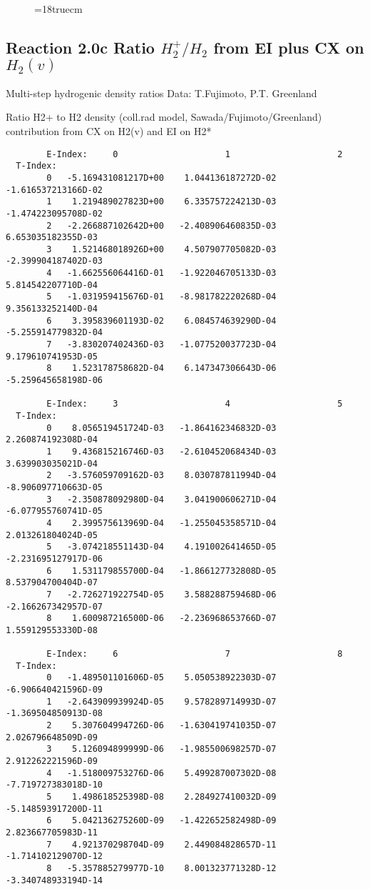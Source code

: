 \begin{figure} \label{2.0b}
\epsfxsize=18truecm
\end{figure}

\newpage

\subsection{
Reaction 2.0c   Ratio $H_2^+/H_2$ from EI plus CX on $H_2(v)$}

 Multi-step hydrogenic density ratios
 Data: T.Fujimoto, P.T. Greenland


  Ratio H2+ to H2 density
  (coll.rad model, Sawada/Fujimoto/Greenland)
  contribution from CX on H2(v) and EI on H2*

\begin{verbatim}
        E-Index:     0                     1                     2
  T-Index:
        0   -5.169431081217D+00    1.044136187272D-02   -1.616537213166D-02
        1    1.219489027823D+00    6.335757224213D-03   -1.474223095708D-02
        2   -2.266887102642D+00   -2.408906460835D-03    6.653035182355D-03
        3    1.521468018926D+00    4.507907705082D-03   -2.399904187402D-03
        4   -1.662556064416D-01   -1.922046705133D-03    5.814542207710D-04
        5   -1.031959415676D-01   -8.981782220268D-04    9.356133252140D-04
        6    3.395839601193D-02    6.084574639290D-04   -5.255914779832D-04
        7   -3.830207402436D-03   -1.077520037723D-04    9.179610741953D-05
        8    1.523178758682D-04    6.147347306643D-06   -5.259645658198D-06

        E-Index:     3                     4                     5
  T-Index:
        0    8.056519451724D-03   -1.864162346832D-03    2.260874192308D-04
        1    9.436815216746D-03   -2.610452068434D-03    3.639903035021D-04
        2   -3.576059709162D-03    8.030787811994D-04   -8.906097710663D-05
        3   -2.350878092980D-04    3.041900606271D-04   -6.077955760741D-05
        4    2.399575613969D-04   -1.255045358571D-04    2.013261804024D-05
        5   -3.074218551143D-04    4.191002641465D-05   -2.231695127917D-06
        6    1.531179855700D-04   -1.866127732808D-05    8.537904700404D-07
        7   -2.726271922754D-05    3.588288759468D-06   -2.166267342957D-07
        8    1.600987216500D-06   -2.236968653766D-07    1.559129553330D-08

        E-Index:     6                     7                     8
  T-Index:
        0   -1.489501101606D-05    5.050538922303D-07   -6.906640421596D-09
        1   -2.643909939924D-05    9.578289714993D-07   -1.369504850913D-08
        2    5.307604994726D-06   -1.630419741035D-07    2.026796648509D-09
        3    5.126094899999D-06   -1.985500698257D-07    2.912262221596D-09
        4   -1.518009753276D-06    5.499287007302D-08   -7.719727383018D-10
        5    1.498618525398D-08    2.284927410032D-09   -5.148593917200D-11
        6    5.042136275260D-09   -1.422652582498D-09    2.823667705983D-11
        7    4.921370298704D-09    2.449084828657D-11   -1.714102129070D-12
        8   -5.357885279977D-10    8.001323771328D-12   -3.340748933194D-14


\end{verbatim}
